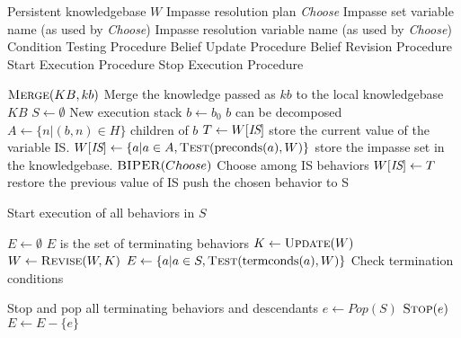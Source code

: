 
\begin{algorithmic}[1]
\small

\Require Persistent knowledgebase $W$
\Require Impasse resolution plan \textit{Choose}
\Require Impasse set variable name \IS (as used by \textit{Choose})
\Require Impasse resolution variable name \IR (as used by \textit{Choose})
\Require Condition Testing Procedure 
\Require Belief Update Procedure 
\Require Belief Revision Procedure 
\Require Start Execution Procedure 
\Require Stop Execution Procedure 

\Statex


\State $\Call{Merge}{KB,kb}$ \Comment Merge the knowledge passed as $kb$ to the local knowledgebase $KB$
\State $S\gets\emptyset$ \Comment New execution stack
\State $b\gets b_0$
\State {} \label{alg:ibc:push}
 \Comment $b$ can be decomposed \label{alg:ibc:allocate}
  \State $A\gets \{n | (b,n)\in H\}$  \Comment children of $b$
  \State $T\gets W[\textit{IS}]$ \Comment store the current value of the variable IS.
  \State $W[\IS]\gets \{a | a\in A, \Call{Test}{\pre(a),W}\}$ \Comment store the impasse set in the knowledgebase.
  \State $\Call{BIPER}{Choose}$ \label{alg:ibc:choose-allocate}\Comment Choose among IS behaviors
  \State $W[\textit{IS}]\gets T$ \Comment restore the previous value of IS
  \State {} \Comment push the chosen behavior to S
\EndWhile \label{alg:ibc:push-end}

\Statex

\label{alg:ibc:exec} \Comment Start execution of all behaviors in $S$
   
\EndFor

\Statex 

\State $E\gets\emptyset$ \label{alg:ibc:monitor-exec}
 \Comment $E$ is the set of terminating behaviors
  \State $K\gets\Call{Update}{W}$
  \State $W\gets\Call{Revise}{W,K}$
  \State $E\gets \{a | a\in S, \Call{Test}{\term(a),W}\}$ \Comment Check termination conditions
\EndWhile  \label{alg:ibc:exec-end}

\Statex

 \label{alg:ibc:terminate} \Comment Stop and pop all terminating behaviors and descendants
  \State $e\gets Pop(S)$
  \State $\Call{Stop}{e}$
    \State $E\gets E-\{e\}$
  \EndIf
\EndWhile \label{alg:ibc:terminate-end}


\end{algorithmic}
